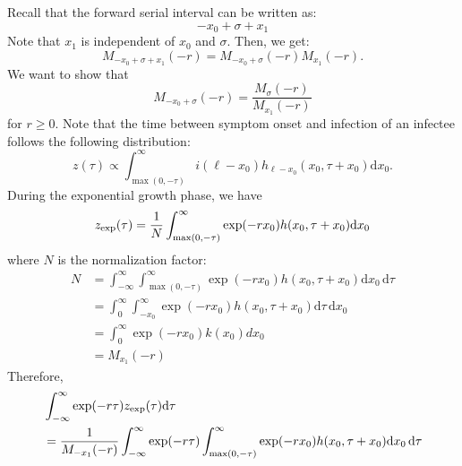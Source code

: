 \documentclass[12pt]{article}
\begin{document}
Recall that the forward serial interval can be written as:
\begin{equation}
- x_0 + \sigma + x_1
\end{equation}
Note that $x_1$ is independent of $x_0$ and $\sigma$. Then, we get:
\begin{equation}
M_{- x_0 + \sigma + x_1}(-r) = M_{- x_0 + \sigma}(-r) M_{x_1}(-r).
\end{equation}
We want to show that 
\begin{equation}
M_{- x_0 + \sigma}(-r)= \frac{M_\sigma(-r)}{M_{x_1}(-r)}
\end{equation}
for $r \geq 0$.
Note that the time between symptom onset and infection of an infectee follows the following distribution:
\begin{equation}
z(\tau) \propto \int_{\max(0, -\tau)}^\infty i(\ell - x_0) h_{\ell - x_0}(x_0, \tau+x_0) \mathrm{d} x_0.
\end{equation}
During the exponential growth phase, we have
\begin{equation}
\begin{aligned}
z_{\tiny\textrm{exp}}(\tau) &= \frac{1}{N} \int_{\max(0, -\tau)}^\infty \exp(- r x_0) h(x_0, \tau+x_0) \mathrm{d} x_0\\
\end{aligned}
\end{equation}
where $N$ is the normalization factor:
\begin{equation}
\begin{aligned}
N &= \int_{-\infty}^\infty \int_{\max(0, -\tau)}^\infty \exp(- r x_0) h(x_0, \tau+x_0) \mathrm{d} x_0\,\mathrm{d}\tau\\
&= \int_{0}^\infty \int_{-x_0}^\infty \exp(- r x_0) h(x_0, \tau+x_0) \mathrm{d}\tau\,\mathrm{d} x_0\\
&= \int_{0}^\infty \exp(- r x_0) k(x_0) dx_0\\
&= M_{x_1}(-r)
\end{aligned}
\end{equation}
Therefore,
\begin{equation}
\begin{aligned}
&\int_{-\infty}^{\infty} \exp(-r\tau) z_{\tiny\textrm{exp}}(\tau) \mathrm{d}\tau\\
&=\frac{1}{M_{-x_1}(-r)} \int_{-\infty}^{\infty} \exp(-r\tau) \int_{\max(0, -\tau)}^\infty \exp(- r x_0) h(x_0, \tau+x_0) \mathrm{d} x_0\, \mathrm{d}\tau
\end{aligned}
\end{equation}
\end{document}
